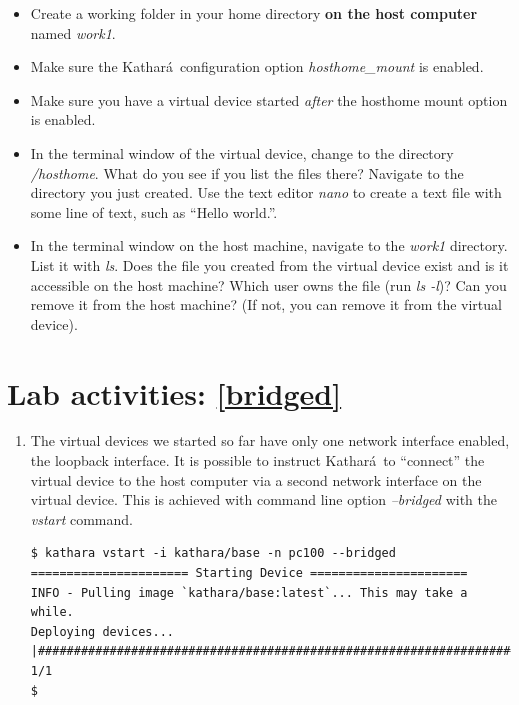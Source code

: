 \documentclass[12pt]{book}
\newcommand{\kathara}{Kathar\'a}
\begin{document}
\begin{enumerate}[label=\arabic*.]
\begin{enumerate}[resume*]
  \begin{itemize}[label=--]
  \item Create a working folder in your home directory \textbf{on the host computer} named \emph{work1}.
  \item Make sure the \kathara\ configuration option \emph{hosthome\_mount} is enabled.
  \item Make sure you have a virtual device started \emph{after} the hosthome mount option is enabled.
  \item In the terminal window of the virtual device, change to the directory \emph{/hosthome}. What do you see if you list the files there? Navigate to the directory you just created. Use the text editor \emph{nano} to create a text file with some line of text, such as ``Hello world.''.
  \item In the terminal window on the host machine, navigate to the \emph{work1} directory. List it with \emph{ls}. Does the file you created from the virtual device exist and is it accessible on the host machine? Which user owns the file (run \emph{ls -l})? Can you remove it from the host machine? (If not, you can remove it from the virtual device).
  \end{itemize}

\end{enumerate}

\section{Lab activities: \ref{bridged}}

\begin{enumerate}[resume*]
\item The virtual devices we started so far have only one network interface enabled, the loopback interface. It is possible to instruct \kathara\ to ``connect'' the virtual device to the host computer via a second network interface on the virtual device. This is achieved with command line option \emph{--bridged} with the \emph{vstart} command.

\begin{lstlisting}
$ kathara vstart -i kathara/base -n pc100 --bridged
====================== Starting Device ======================
INFO - Pulling image `kathara/base:latest`... This may take a while.
Deploying devices... |###############################################################################################| 1/1
$
\end{lstlisting}


\end{enumerate}
\end{enumerate}
\end{document}
